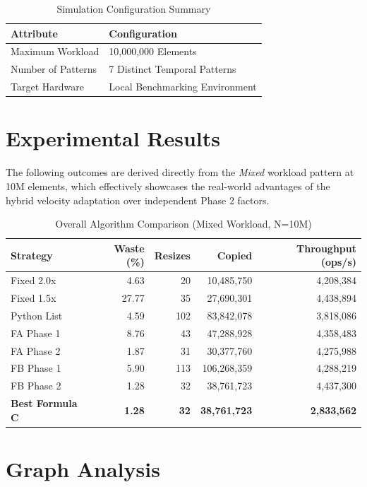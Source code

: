 \documentclass[11pt, a4paper]{article}
\begin{document}
\begin{table}[H]
\centering
\caption{Simulation Configuration Summary}
\begin{tabular}{@{}ll@{}}
\toprule
\textbf{Attribute} & \textbf{Configuration} \\
\midrule
Maximum Workload & 10,000,000 Elements \\
Number of Patterns & 7 Distinct Temporal Patterns \\
Target Hardware & Local Benchmarking Environment \\
\bottomrule
\end{tabular}
\end{table}

\section{Experimental Results}
The following outcomes are derived directly from the \textit{Mixed} workload pattern at 10M elements, which effectively showcases the real-world advantages of the hybrid velocity adaptation over independent Phase 2 factors.

\begin{table}[H]
\centering
\caption{Overall Algorithm Comparison (Mixed Workload, N=10M)}
\label{tab:baseline_comp}
\begin{tabular}{lrrrr}
\toprule
\textbf{Strategy} & \textbf{Waste (\%)} & \textbf{Resizes} & \textbf{Copied} & \textbf{Throughput (ops/s)} \\
\midrule
Fixed 2.0x & 4.63 & 20 & 10,485,750 & 4,208,384 \\
Fixed 1.5x & 27.77 & 35 & 27,690,301 & 4,438,894 \\
Python List & 4.59 & 102 & 83,842,078 & 3,818,086 \\
FA Phase 1 & 8.76 & 43 & 47,288,928 & 4,358,483 \\
FA Phase 2 & 1.87 & 31 & 30,377,760 & 4,275,988 \\
FB Phase 1 & 5.90 & 113 & 106,268,359 & 4,288,219 \\
FB Phase 2 & 1.28 & 32 & 38,761,723 & 4,437,300 \\
\textbf{Best Formula C} & \textbf{1.28} & \textbf{32} & \textbf{38,761,723} & \textbf{2,833,562} \\
\bottomrule
\end{tabular}
\end{table}

\section{Graph Analysis}
\end{document}
